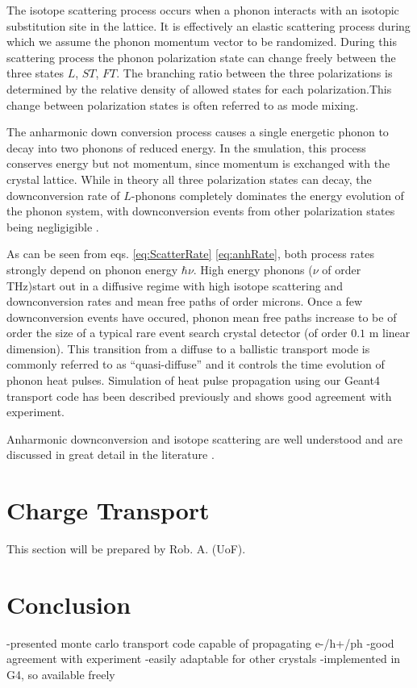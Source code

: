 \documentclass[preprint,12pt]{elsarticle}
\begin{document}
The isotope scattering process occurs when a phonon interacts with an isotopic substitution site in the lattice. It is effectively an elastic scattering process during which we assume the phonon momentum vector to be randomized. During this scattering process the phonon polarization state can change freely between the three states $L$, $ST$, $FT$. The branching ratio between the three polarizations is determined by the relative density of allowed states for each polarization.This change between polarization states is often referred to as mode mixing.

The anharmonic down conversion process causes a single energetic phonon to decay into two phonons of reduced energy. In the smulation, this process conserves energy but not momentum, since momentum is exchanged with the crystal lattice. While in theory all three polarization states can decay, the downconversion rate of $L$-phonons completely dominates the energy evolution of the phonon system, with downconversion events from other polarization states being negligigible \cite{Tamura2}.


As can be seen from eqs. \ref{eq:ScatterRate} \ref{eq:anhRate}, both process rates strongly depend on phonon energy $\hbar \nu$. High energy phonons ($\nu$ of order THz)start out in a diffusive regime with high isotope scattering and downconversion rates and mean free paths of order microns. Once a few downconversion events have occured, phonon mean free paths increase to be of order the size of a typical rare event search crystal detector (of order $0.1$ m linear dimension). This transition from a diffuse to a ballistic transport mode is commonly referred to as ``quasi-diffuse'' and it controls the time evolution of phonon heat pulses. Simulation of heat pulse propagation using our Geant4 transport code has been described previously \cite{Brandt} and shows good agreement with experiment.

Anharmonic downconversion and isotope scattering are well understood and are discussed in great detail in the literature \cite{Tamura1}\cite{Tamura2}\cite{Wolfe}\cite{Tamura3}.




\section{Charge Transport}
\label{sec:ChargeTransport}

This section will be prepared by Rob. A. (UoF).

\section{Conclusion}
\label{sec:Conclusion}
 -presented monte carlo transport code capable of propagating e-/h+/ph
 -good agreement with experiment
 -easily adaptable for other crystals
 -implemented in G4, so available freely
\end{document}
